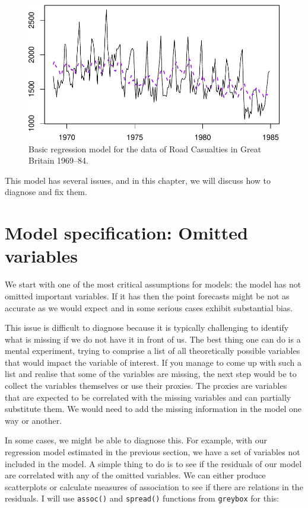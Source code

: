 \documentclass[
]{book}
\theoremstyle{definition}
\theoremstyle{definition}
\theoremstyle{definition}
\theoremstyle{definition}
\theoremstyle{remark}
\begin{document}
\begin{figure}
\centering
\includegraphics{Svetunkov--2022----ADAM_files/figure-latex/adamSeat01-1.pdf}
\caption{\label{fig:adamSeat01}Basic regression model for the data of Road Casualties in Great Britain 1969--84.}
\end{figure}

This model has several issues, and in this chapter, we will discuss how to diagnose and fix them.

\hypertarget{diagnosticsOmitted}{%
\section{Model specification: Omitted variables}\label{diagnosticsOmitted}}

We start with one of the most critical assumptions for models: the model has not omitted important variables. If it has then the point forecasts might be not as accurate as we would expect and in some serious cases exhibit substantial bias.

This issue is difficult to diagnose because it is typically challenging to identify what is missing if we do not have it in front of us. The best thing one can do is a mental experiment, trying to comprise a list of all theoretically possible variables that would impact the variable of interest. If you manage to come up with such a list and realise that some of the variables are missing, the next step would be to collect the variables themselves or use their proxies. The proxies are variables that are expected to be correlated with the missing variables and can partially substitute them. We would need to add the missing information in the model one way or another.

In some cases, we might be able to diagnose this. For example, with our regression model estimated in the previous section, we have a set of variables not included in the model. A simple thing to do is to see if the residuals of our model are correlated with any of the omitted variables. We can either produce scatterplots or calculate measures of association \citep[see Section 2.2 and Chapter 6 of][]{SvetunkovSBA} to see if there are relations in the residuals. I will use \texttt{assoc()} and \texttt{spread()} functions from \texttt{greybox} for this:
\end{document}

